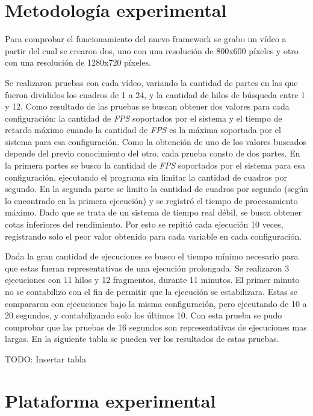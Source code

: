
\section{Metodología experimental}

Para comprobar el funcionamiento del nuevo framework se grabo un vídeo a partir
del cual se crearon dos, uno con una resolución de 800x600 píxeles y otro con
una resolución de 1280x720 píxeles.

Se realizaron pruebas con cada vídeo, variando la cantidad de partes en las que
fueron divididos los cuadros de 1 a 24, y la cantidad de hilos de búsqueda entre
1 y 12. Como resultado de las pruebas se buscan obtener dos valores para cada
configuración: la cantidad de \emph{FPS} soportados por el sistema y el tiempo
de retardo máximo cuando la cantidad de \emph{FPS} es la máxima soportada por el
sistema para esa configuración. Como la obtención de uno de los valores buscados
depende del previo conocimiento del otro, cada prueba consto de dos partes.
En la primera partes se busco la cantidad de \emph{FPS} soportados por el
sistema para esa configuración, ejecutando el programa sin limitar la cantidad
de cuadros por segundo. En la segunda parte se limito la cantidad de
cuadros por segundo (según lo encontrado en la primera ejecución) y se registró
el tiempo de procesamiento máximo. Dado que se trata de un sistema de
tiempo real débil, se busca obtener cotas inferiores del rendimiento. Por esto
se repitió cada ejecución 10 veces, registrando solo el peor valor obtenido para
cada variable en cada configuración.

Dada la gran cantidad de ejecuciones se busco el tiempo mínimo necesario para
que estas fueran representativas de una ejecución prolongada. Se realizaron 3
ejecuciones con 11 hilos y 12 fragmentos, durante 11 minutos. El primer minuto
no se contabilizo con el fin de permitir que la ejecución se estabilizara.
Estas se compararon con ejecuciones bajo la misma configuración, pero ejecutando
de 10 a 20 segundos, y contabilizando solo los últimos 10. Con esta prueba se
pudo comprobar que las pruebas de 16 segundos son representativas de ejecuciones
mas largas. En la siguiente tabla se pueden ver los resultados de estas pruebas.

TODO: Insertar tabla

\section{Plataforma experimental}

